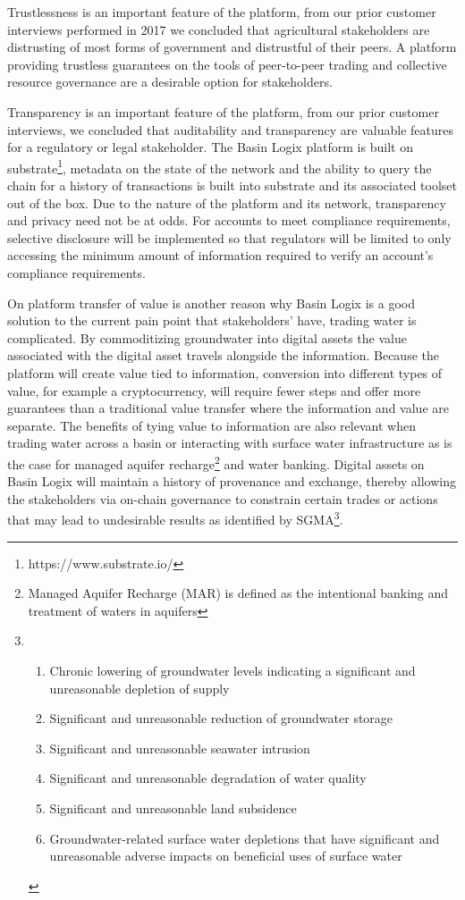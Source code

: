\documentclass{tufte-handout}
\begin{document}
Trustlessness is an important feature of the platform, from our prior customer interviews performed in 2017 we concluded that agricultural stakeholders are distrusting of most forms of government and distrustful of their peers. A platform providing trustless guarantees on the tools of peer-to-peer trading and collective resource governance are a desirable option for stakeholders. 

Transparency is an important feature of the platform, from our prior customer interviews, we concluded that auditability and transparency are valuable features for a regulatory or legal stakeholder. The Basin Logix platform is built on substrate\footnote{https://www.substrate.io/}, metadata on the state of the network and the ability to query the chain for a history of transactions is built into substrate and its associated toolset out of the box. Due to the nature of the platform and its network, transparency and privacy need not be at odds. For accounts to meet compliance requirements, selective disclosure will be implemented so that regulators will be limited to only accessing the minimum amount of information required to verify an account's compliance requirements.   


On platform transfer of value is another reason why Basin Logix is a good solution to the current pain point that stakeholders' have, trading water is complicated. By commoditizing groundwater into digital assets the value associated with the digital asset travels alongside the information. Because the platform will create value tied to information, conversion into different types of value, for example a cryptocurrency, will require fewer steps and offer more guarantees than a traditional value transfer where the information and value are separate. The benefits of tying value to information are also relevant when trading water across a basin or interacting with surface water infrastructure as is the case for managed aquifer recharge\footnote{Managed Aquifer Recharge (MAR) is defined as the intentional
banking and treatment of waters in aquifers} and water banking. Digital assets on Basin Logix will maintain a history of provenance and exchange, thereby allowing the stakeholders via on-chain governance to constrain certain trades or actions that may lead to undesirable results as identified by SGMA\footnote{
\begin{enumerate}
  \item Chronic lowering of groundwater levels indicating a significant and unreasonable depletion of supply
  \item Significant and unreasonable reduction of groundwater storage
  \item Significant and unreasonable seawater intrusion
  \item Significant and unreasonable degradation of water quality
  \item Significant and unreasonable land subsidence
  \item Groundwater-related surface water depletions that have significant and unreasonable adverse impacts on beneficial uses of surface water
\end{enumerate}
}.   
\end{document}
